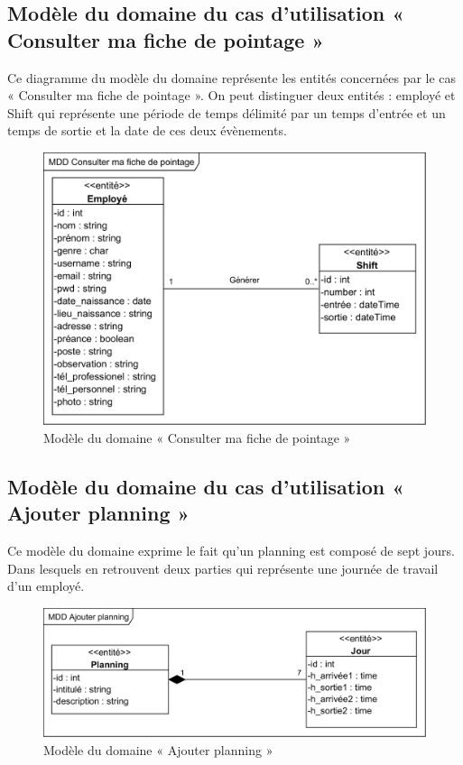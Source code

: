         \subsection*{Modèle du domaine du cas d'utilisation « Consulter ma fiche de pointage »}
         Ce diagramme du modèle du domaine représente les entités concernées par le cas « Consulter ma fiche de pointage ». On peut distinguer deux entités : employé et Shift qui représente une période de temps délimité par un temps d’entrée et un temps de sortie et la date de ces deux évènements.
         \clearpage
            \begin{figure}[h!]
                 \centering
                \includegraphics[scale=1.168]{images/MDD/MDD Consulter ma fiche de pointage.png}
                 \caption{Modèle du domaine « Consulter ma fiche de pointage »}
                 \label{fig13}
            \end{figure}
            
        \subsection*{Modèle du domaine du cas d'utilisation « Ajouter planning »}
         Ce modèle du domaine exprime le fait qu’un planning est composé de sept jours. Dans lesquels en retrouvent deux parties qui représente une journée de travail d’un employé.
         
            \begin{figure}[h!]
                 \centering
                \includegraphics[scale=1.12]{images/MDD/MDD Ajouter planning.png}
                 \caption{Modèle du domaine « Ajouter planning »}
                 \label{fig14}
            \end{figure}
        
